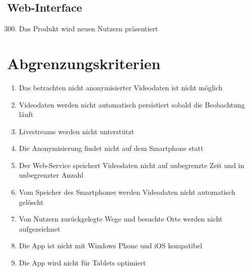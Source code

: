 \subsection{Web-Interface}
	\begin{enumerate}[\bfseries{WK}10]
	\setcounter{enumi}{299}
	\item Das Produkt wird neuen Nutzern präsentiert
	\end{enumerate}

\section{Abgrenzungskriterien}
	\begin{enumerate}[\bfseries{AK}1010]
	\item Das betrachten nicht anonymisierter Videodaten ist nicht möglich
	\item Videodaten werden nicht automatisch persistiert sobald die Beobachtung läuft
	\item Livestreams werden nicht unterstützt
	\item Die Anonymisierung findet nicht auf dem Smartphone statt
	\item Der Web-Service speichert Videodaten nicht auf unbegrenzte Zeit und in unbegrenzter Anzahl
	\item Vom Speicher des Smartphones werden Videodaten nicht automatisch gelöscht
	\item Von Nutzern zurückgelegte Wege und besuchte Orte werden nicht aufgezeichnet
	\item Die App ist nicht mit Windows Phone und iOS kompatibel
	\item Die App wird nicht für Tablets optimiert
	\end{enumerate}